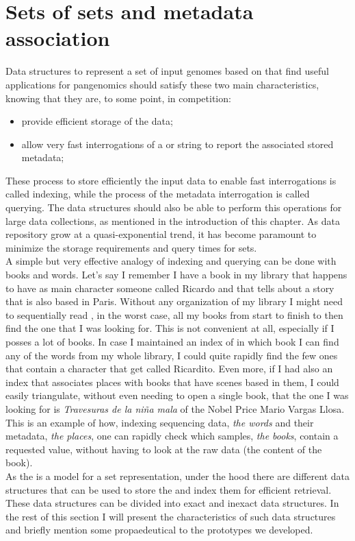 \section{Sets of \kmers sets and metadata association}
Data structures to represent a set of input genomes based on \kmers that find useful applications for pangenomics should satisfy these two main characteristics, knowing that they are, to some point, in competition:
\begin{itemize}
	\item provide efficient storage of the data;
	\item allow very fast interrogations of a \kmer or string to report the associated stored metadata;
\end{itemize}
These process to store efficiently the input data to enable fast interrogations is called indexing, while the process of the metadata interrogation is called querying. The data structures should also be able to perform this operations for large data collections, as mentioned in the introduction of this chapter. As data repository grow at a quasi-exponential trend, it has become paramount to minimize the storage requirements and query times for \kmer sets. \\
A simple but very effective analogy of indexing and querying can be done with books and words.
Let's say I remember I have a book in my library that happens to have as main character someone called Ricardo and that tells about a story that is also based in Paris. Without any organization of my library I might need to sequentially read , in the worst case, all my books from start to finish to then find the one that I was looking for. This is not convenient at all, especially if I posses a lot of books. In case I maintained an index of in which book I can find any of the words from my whole library, I could quite rapidly find the few ones that contain a character that get called Ricardito. Even more, if I had also an index that associates places with books that have scenes based in them, I could easily triangulate, without even needing to open a single book, that the one I was looking for is \emph{Travesuras de la niña mala} of the Nobel Price  Mario Vargas Llosa.
This is an example of how, indexing sequencing data, \emph{the words} and their metadata, \emph{the places}, one can rapidly check which samples, \emph{the books}, contain a requested value, without having to look at the raw data (the content of the book).\\
As the \dbg is a model for a \kmer set representation, under the hood there are different data structures that can be used to store the \kmers and index them for efficient retrieval. These data structures can be divided into exact and inexact data structures. In the rest of this section I will present the characteristics of such data structures and briefly mention some propaedeutical to the prototypes we developed.


